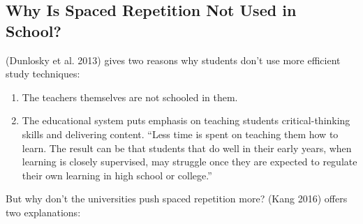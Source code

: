 \subsection{Why Is Spaced Repetition Not Used in
School?}\label{why-is-spaced-repetition-not-used-in-school}

(Dunlosky et al. 2013) gives two reasons why students don't use more
efficient study techniques:

\begin{enumerate}
\def\labelenumi{\arabic{enumi}.}
\tightlist
\item
  The teachers themselves are not schooled in them.
\item
  The educational system puts emphasis on teaching students
  critical-thinking skills and delivering content. ``Less time is spent
  on teaching them how to learn. The result can be that students that do
  well in their early years, when learning is closely supervised, may
  struggle once they are expected to regulate their own learning in high
  school or college.''
\end{enumerate}

But why don't the universities push spaced repetition more? (Kang 2016)
offers two explanations:

